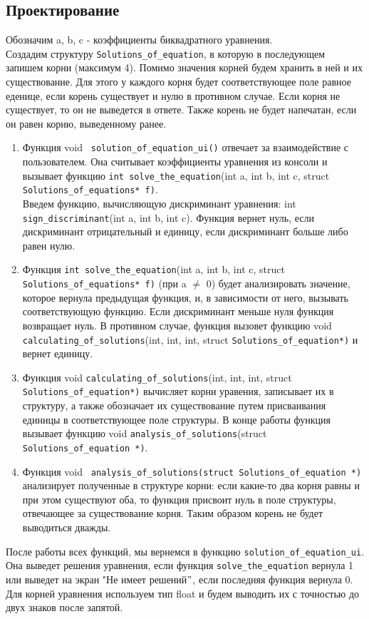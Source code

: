 \documentclass[12pt,a4paper]{report}
\begin{document}
\subsection{Проектирование}
Обозначим a, b, c - коэффициенты биквадратного уравнения. \\
Создадим структуру \verb+Solutions_of_equation+, в которую в последующем запишем корни (максимум 4). Помимо значения корней будем хранить в ней и их существование. Для этого у каждого корня будет соответствующее поле равное еденице, если корень существует и нулю в противном случае. Если корня не существует, то он не выведется в ответе. Также корень не будет напечатан, если он равен корню, выведенному ранее. \\
\begin{enumerate}
\item
Функция void \verb+ solution_of_equation_ui()+ отвечает за взаимодействие с пользователем. Она считывает коэффициенты уравнения из консоли и вызывает функцию \verb+int solve_the_equation+(int a, int b, int c, struct \verb+Solutions_of_equations* f)+.  \\
Введем функцию, вычисляющую дискриминант уравнения: int \verb+sign_discriminant+(int a, int b, int c). Функция вернет нуль, если дискриминант отрицательный и единицу, если дискриминант больше либо равен нулю. \\
\item
Функция  \verb+int solve_the_equation+(int a, int b, int c, struct \verb+Solutions_of_equations* f)+ (при a $\neq$ 0) будет анализировать значение, которое вернула предыдущая функция, и, в  зависимости от него, вызывать соответствующую функцию. Если дискриминант меньше нуля функция возвращает нуль. В противном случае, функция вызовет функцию void \verb+ calculating_of_solutions+(int, int, int, struct \verb+Solutions_of_equation*)+ и вернет единицу. 
\item
Функция void \verb+calculating_of_solutions+(int, int, int, struct \verb+Solutions_of_equation*)+ вычисляет корни уравения, записывает их в структуру, а также обозначает их существование путем присваивания единицы в соответствующее поле структуры. В конце работы функция вызывает функцию void \verb+analysis_of_solutions+(struct \verb+Solutions_of_equation *)+. \\
\item
Функция void \verb+ analysis_of_solutions(struct Solutions_of_equation *)+ анализирует полученные в структуре корни: если какие-то два корня равны и при этом существуют оба, то функция присвоит нуль в поле структуры, отвечающее за существование корня. Таким образом корень не будет выводиться дважды. \\
\end{enumerate}
После работы всех функций, мы вернемся в функцию \verb+solution_of_equation_ui+. Она выведет решения уравнения, если функция \verb+solve_the_equation+ вернула 1 или выведет на экран "Не имеет решений$"$, если последняя функция вернула 0. \\
Для корней уравнения используем тип float и будем выводить их с точностью до двух знаков после запятой. 
\end{document}
